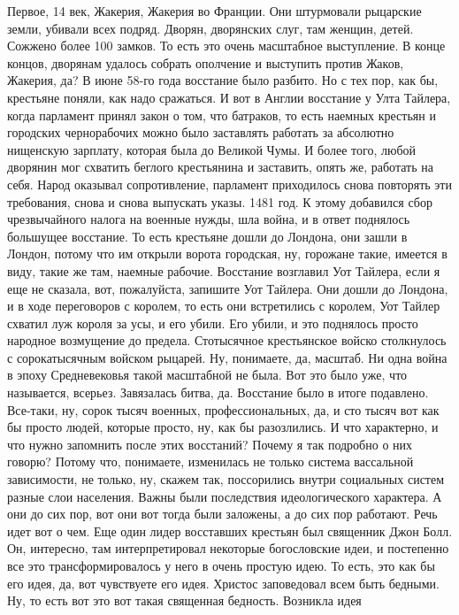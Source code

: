 Первое, 14 век, Жакерия, Жакерия во Франции. Они штурмовали
рыцарские земли, убивали всех подряд. Дворян, дворянских слуг, там женщин,
детей. Сожжено более 100 замков. То есть это очень масштабное выступление. В
конце концов, дворянам удалось собрать ополчение и выступить против Жаков,
Жакерия, да? В июне 58-го года восстание было разбито. Но с тех пор, как бы,
крестьяне поняли, как надо сражаться. И вот в Англии восстание у Улта Тайлера,
когда парламент принял закон о том, что батраков, то есть наемных крестьян и
городских чернорабочих можно было заставлять работать за абсолютно нищенскую
зарплату, которая была до Великой Чумы. И более того, любой дворянин мог
схватить беглого крестьянина и заставить, опять же, работать на себя. Народ
оказывал сопротивление, парламент приходилось снова повторять эти требования,
снова и снова выпускать указы. 1481 год. К этому добавился сбор чрезвычайного
налога на военные нужды, шла война, и в ответ поднялось большущее восстание. То
есть крестьяне дошли до Лондона, они зашли в Лондон, потому что им открыли
ворота городская, ну, горожане такие, имеется в виду, такие же там, наемные
рабочие. Восстание возглавил Уот Тайлера, если я еще не сказала, вот,
пожалуйста, запишите Уот Тайлера. Они дошли до Лондона, и в ходе переговоров с
королем, то есть они встретились с королем, Уот Тайлер схватил луж короля за
усы, и его убили. Его убили, и это поднялось просто народное возмущение до
предела. Стотысячное крестьянское войско столкнулось с сорокатысячным войском
рыцарей. Ну, понимаете, да, масштаб. Ни одна война в эпоху Средневековья такой
масштабной не была. Вот это было уже, что называется, всерьез. Завязалась битва,
да. Восстание было в итоге подавлено. Все-таки, ну, сорок тысяч военных,
профессиональных, да, и сто тысяч вот как бы просто людей, которые просто, ну,
как бы разозлились. И что характерно, и что нужно запомнить после этих
восстаний? Почему я так подробно о них говорю? Потому что, понимаете, изменилась
не только система вассальной зависимости, не только, ну, скажем так, поссорились
внутри социальных систем разные слои населения. Важны были последствия
идеологического характера. А они до сих пор, вот они вот тогда были заложены, а
до сих пор работают. Речь идет вот о чем. Еще один лидер восставших крестьян был
священник Джон Болл. Он, интересно, там интерпретировал некоторые богословские
идеи, и постепенно все это трансформировалось у него в очень простую идею. То
есть, это как бы его идея, да, вот чувствуете его идея. Христос заповедовал всем
быть бедными. Ну, то есть вот это вот такая священная бедность. Возникла идея
